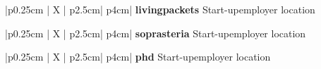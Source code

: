 

%
%
\iftrue %
\begin{myTableEnv}{|p{0.25cm} | X | p{2.5cm}| p{4cm}|}%
    \myRow
        {}{\bfseries livingpackets} %
        {Start-up}{employer} %
    \myRow
        {}{}%
        {}{location}%
\end{myTableEnv}%
%
%
\myTablesSeparator
%
%
\fi
%
%
\iftrue %
\begin{myTableEnv}{|p{0.25cm} | X | p{2.5cm}| p{4cm}|}%
    \myRow
        {}{\bfseries soprasteria} %
        {Start-up}{employer} %
    \myRow
        {}{}%
        {}{location}%
\end{myTableEnv}%
%
%
\myTablesSeparator
%
%
\fi
%
%
\iftrue %
\begin{myTableEnv}{|p{0.25cm} | X | p{2.5cm}| p{4cm}|}%
    \myRow
        {}{\bfseries phd} %
        {Start-up}{employer} %
    \myRow
        {}{}%
        {}{location}%
\end{myTableEnv}%
%
%
\myTablesSeparator
%
%
\fi
%
%
